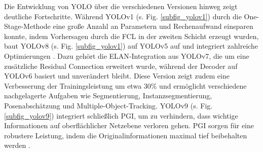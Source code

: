 
Die Entwicklung von \acrshort{YOLO} über die verschiedenen Versionen hinweg zeigt deutliche Fortschritte. Während \acrshort{YOLO}v1 (s. Fig. \ref{subfig_yolov1}) durch die One-Stage-Methode eine große Anzahl an Parametern und Rechenaufwand einsparen konnte, indem Vorhersagen durch die \acrshort{FCL} in der zweiten Schicht erzeugt wurden, baut \acrshort{YOLO}v8 (s. Fig. \ref{subfig_yolov1}) auf \acrshort{YOLO}v5 auf und integriert zahlreiche Optimierungen \cite{Wang2024_yolo_review}. Dazu gehört die \acrfull{ELAN}-Integration aus \acrshort{YOLO}v7, die um eine zusätzliche Residual Connection erweitert wurde, während der Decoder auf \acrshort{YOLO}v6 basiert und unverändert bleibt. Diese Version zeigt zudem eine Verbesserung der Trainingsleistung um etwa 30\% und ermöglicht verschiedene nachgelagerte Aufgaben wie Segmentierung, Instanzsegmentierung, Posenabschätzung und Multiple-Object-Tracking. \acrshort{YOLO}v9 (s. Fig. \ref{subfig_yolov9}) integriert schließlich \acrshort{PGI}, um zu verhindern, dass wichtige Informationen auf oberflächlicher Netzebene verloren gehen. \acrshort{PGI} sorgen für eine robustere Leistung, indem die Originalinformationen maximal tief beibehalten werden \cite{Wang2024_yolo_review}.


